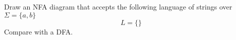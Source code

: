 Draw an NFA diagram that accepts the following
language of strings over $\Sigma =
\{ a, b \}$ 
\[
L = \{\}
\]
Compare with a DFA.
